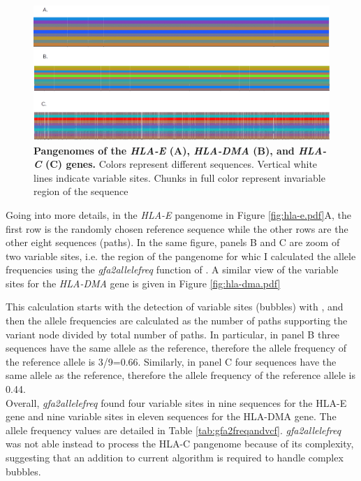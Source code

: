 \begin{figure}[H]
\centering
\includegraphics[width=1.00\textwidth]{fig/pangenomes.png}
\decoRule
\caption{\textbf{Pangenomes of the \textit{HLA-E} (A), \textit{HLA-DMA} (B), and \textit{HLA-C} (C) genes.} Colors represent different sequences. Vertical white lines indicate variable sites. Chunks in full color represent invariable region of the sequence}
\label{fig:pangenomesHLA.png}
\end{figure}


Going into more details, in the \textit{HLA-E} pangenome in Figure \ref{fig:hla-e.pdf}A, the first row is the randomly chosen reference sequence while the other rows are the other eight sequences (paths). In the same figure, panels B and C are zoom of two variable sites, i.e. the region of the pangenome for whic I calculated the allele frequencies using the \textit{gfa2allelefreq} function of \vgp. A similar view of the variable sites for the \textit{HLA-DMA} gene is given in Figure \ref{fig:hla-dma.pdf}

This calculation starts with the detection of variable sites (bubbles) with \bbp, and then the allele frequencies are calculated as the number of paths supporting the variant node divided by total number of paths.
In particular, in panel B three sequences have the same allele as the reference, therefore the allele frequency of the reference allele is 3/9=0.66. Similarly, in panel C four sequences have the same allele as the reference, therefore the allele frequency of the reference allele is 0.44. \\

Overall, \textit{gfa2allelefreq} found four variable sites in nine sequences for the HLA-E gene and nine variable sites in eleven sequences for the HLA-DMA gene. The allele frequency values are detailed in Table \ref{tab:gfa2freqandvcf}. \textit{gfa2allelefreq} was not able instead to process the HLA-C pangenome because of its complexity, suggesting  
that an addition to current algorithm is required to handle complex bubbles. %


